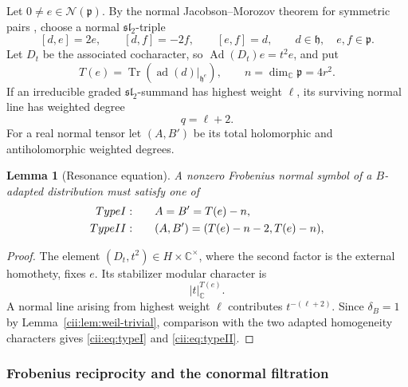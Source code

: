 \documentclass[10pt,a4paper]{amsart}
\numberwithin{equation}{section}
\newtheorem{lemma}[theorem]{Lemma}
\newcommand{\C}{\mathbb C}
\newcommand{\Ad}{\operatorname{Ad}}
\newcommand{\ad}{\operatorname{ad}}
\newcommand{\Tr}{\operatorname{Tr}}
\newcommand{\cN}{\mathcal N}
\begin{document}
Let \(0\neq e\in\cN(\mathfrak p)\).  By the normal
Jacobson--Morozov theorem for symmetric pairs
\cite[Proposition~4]{KR}, choose a normal
\(\mathfrak{sl}_2\)-triple
\[
[d,e]=2e,\qquad
[d,f]=-2f,\qquad
[e,f]=d,
\qquad
d\in\mathfrak h,\quad e,f\in\mathfrak p.
\]
Let \(D_t\) be the associated cocharacter, so
\(\Ad(D_t)e=t^2e\), and put
\begin{equation}\label{cii:eq:trace}
T(e)=\Tr\!\left(\ad(d)|_{\mathfrak h^e}\right),
\qquad
n=\dim_\C\mathfrak p=4r^2.
\end{equation}
If an irreducible graded \(\mathfrak{sl}_2\)-summand has highest weight
\(\ell\), its surviving normal line has weighted degree
\[
q=\ell+2.
\]
For a real normal tensor let \((A,B')\) be its total holomorphic and
antiholomorphic weighted degrees.

\begin{lemma}[Resonance equation]\label{cii:lem:resonance}
A nonzero Frobenius normal symbol of a \(B\)-adapted distribution must
satisfy one of
\begin{align}
\textnormal{Type I:}\qquad
&A=B'=T(e)-n, \label{cii:eq:typeI}\\
\textnormal{Type II:}\qquad
&(A,B')=(T(e)-n-2,T(e)-n), \label{cii:eq:typeII}
\end{align}
\end{lemma}

\begin{proof}
The element \((D_t,t^2)\in H\times\C^\times\), where the second factor is
the external homothety, fixes \(e\).  Its stabilizer modular character is
\[
|t|_\C^{T(e)}.
\]
A normal line arising from highest weight \(\ell\) contributes
\(t^{-(\ell+2)}\).  Since \(\delta_B=1\) by
Lemma~\ref{cii:lem:weil-trivial}, comparison with the two adapted homogeneity
characters gives \eqref{cii:eq:typeI} and \eqref{cii:eq:typeII}.
\end{proof}

\subsubsection{Frobenius reciprocity and the conormal filtration}
\end{document}
